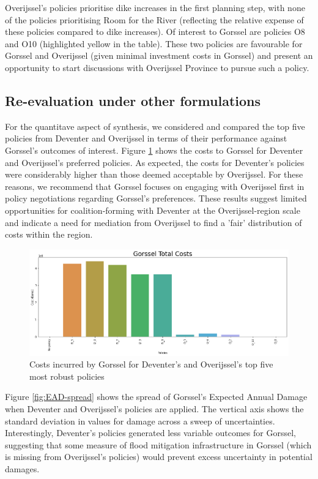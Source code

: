 \noindent Overijssel's policies prioritise dike increases in the first planning step, with none of the policies prioritising Room for the River (reflecting the relative expense of these policies compared to dike increases). Of interest to Gorssel are policies O8 and O10 (highlighted yellow in the table). These two policies are favourable for Gorssel and Overijssel (given minimal investment costs in Gorssel) and present an opportunity to start discussions with Overijssel Province to pursue such a policy.

\subsection{Re-evaluation under other formulations}
For the quantitave aspect of synthesis, we considered and compared the top five policies from Deventer and Overijssel in terms of their performance against Gorssel's outcomes of interest. Figure \ref{fig:cost-pol-g} shows the costs to Gorssel for Deventer and Overijssel's preferred policies. As expected, the costs for Deventer's policies were considerably higher than those deemed acceptable by Overijssel. For these reasons, we recommend that Gorssel focuses on engaging with Overijssel first in policy negotiations regarding Gorssel's preferences. These results suggest limited opportunities for coalition-forming with Deventer at the Overijssel-region scale and indicate a need for mediation from Overijssel to find a 'fair' distribution of costs within the region.

\begin{figure}[h!]
    \centering
    \includegraphics[width=\textwidth]{report/figures/results/spreads/cost_policies_Gorssel.png}
    \caption{Costs incurred by Gorssel for Deventer's and Overijssel's top five most robust policies}
    \label{fig:cost-pol-g}
\end{figure}

Figure \ref{fig:EAD-spread} shows the spread of Gorssel's Expected Annual Damage when Deventer and Overijssel's policies are applied. The vertical axis shows the standard deviation in values for damage across a sweep of uncertainties. Interestingly, Deventer's policies generated less variable outcomes for Gorssel, suggesting that some measure of flood mitigation infrastructure in Gorssel (which is missing from Overijssel's policies) would prevent excess uncertainty in potential damages.

